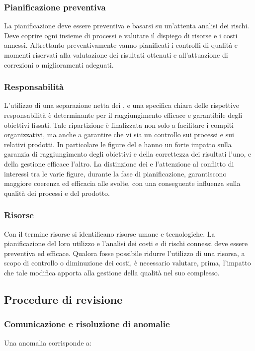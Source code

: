 \documentclass[12pt,a4paper]{article}
\begin{document}
	\subsubsection{Pianificazione preventiva}
	La pianificazione deve essere preventiva e basarsi su un'attenta analisi dei rischi. Deve coprire ogni insieme di processi e valutare il dispiego di risorse e i costi annessi. Altrettanto preventivamente vanno pianificati i controlli di qualità e momenti riservati alla valutazione dei risultati ottenuti e all'attuazione di correzioni o miglioramenti adeguati.
	
	\subsubsection{Responsabilità}
	L'utilizzo di una separazione netta dei , e una specifica chiara delle rispettive responsabilità è determinante per il raggiungimento efficace e garantibile degli obiettivi fissati. Tale ripartizione è finalizzata non solo a facilitare i compiti organizzativi, ma anche a garantire che vi sia un controllo sui processi e sui relativi prodotti. In particolare le figure del \VR e \RE hanno un forte impatto sulla garanzia di raggiungimento degli obiettivi e della correttezza dei risultati l'uno, e della gestione efficace l'altro. La distinzione dei  e l'attenzione al conflitto di interessi tra le varie figure, durante la fase di pianificazione, garantiscono maggiore coerenza ed efficacia alle  svolte, con una conseguente influenza sulla qualità dei processi e del prodotto.
	
	\subsubsection{Risorse}\label{risorse}
	Con il termine risorse si identificano risorse umane e tecnologiche. La pianificazione del loro utilizzo e l'analisi dei costi e di rischi connessi deve essere preventiva ed efficace. Qualora fosse possibile ridurre l'utilizzo di una risorsa, a scopo di controllo o diminuzione dei costi, è necessario valutare, prima, l'impatto che tale modifica apporta alla gestione della qualità nel suo complesso.
	
	\subsection{Procedure di revisione}
	
	\subsubsection{Comunicazione e risoluzione di anomalie}
	Una anomalia corrisponde a:
	
\end{document}

